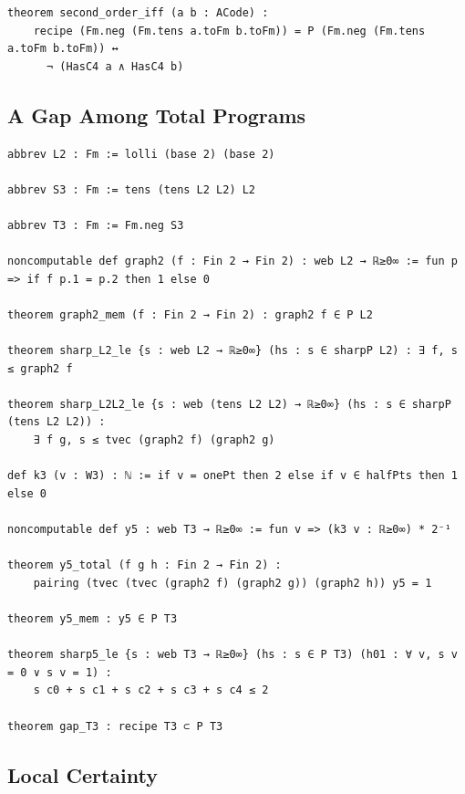 \label{lean:second-iff}
\begin{lstlisting}
theorem second_order_iff (a b : ACode) :
    recipe (Fm.neg (Fm.tens a.toFm b.toFm)) = P (Fm.neg (Fm.tens a.toFm b.toFm)) ↔
      ¬ (HasC4 a ∧ HasC4 b)
\end{lstlisting}

\subsection{A Gap Among Total Programs}

\label{lean:gap-t3}
\begin{lstlisting}
abbrev L2 : Fm := lolli (base 2) (base 2)

abbrev S3 : Fm := tens (tens L2 L2) L2

abbrev T3 : Fm := Fm.neg S3

noncomputable def graph2 (f : Fin 2 → Fin 2) : web L2 → ℝ≥0∞ := fun p => if f p.1 = p.2 then 1 else 0

theorem graph2_mem (f : Fin 2 → Fin 2) : graph2 f ∈ P L2

theorem sharp_L2_le {s : web L2 → ℝ≥0∞} (hs : s ∈ sharpP L2) : ∃ f, s ≤ graph2 f

theorem sharp_L2L2_le {s : web (tens L2 L2) → ℝ≥0∞} (hs : s ∈ sharpP (tens L2 L2)) :
    ∃ f g, s ≤ tvec (graph2 f) (graph2 g)

def k3 (v : W3) : ℕ := if v = onePt then 2 else if v ∈ halfPts then 1 else 0

noncomputable def y5 : web T3 → ℝ≥0∞ := fun v => (k3 v : ℝ≥0∞) * 2⁻¹

theorem y5_total (f g h : Fin 2 → Fin 2) :
    pairing (tvec (tvec (graph2 f) (graph2 g)) (graph2 h)) y5 = 1

theorem y5_mem : y5 ∈ P T3

theorem sharp5_le {s : web T3 → ℝ≥0∞} (hs : s ∈ P T3) (h01 : ∀ v, s v = 0 ∨ s v = 1) :
    s c0 + s c1 + s c2 + s c3 + s c4 ≤ 2

theorem gap_T3 : recipe T3 ⊂ P T3
\end{lstlisting}

\subsection{Local Certainty}

